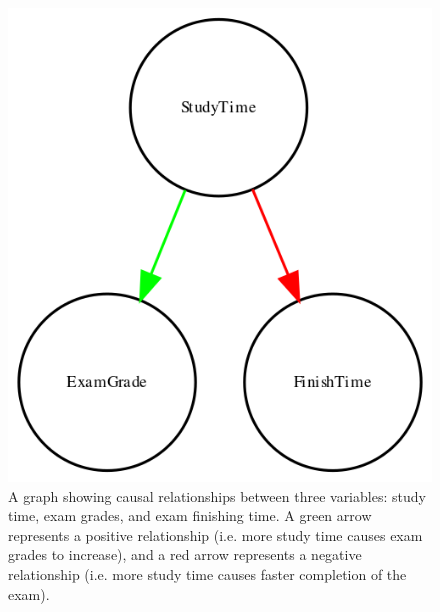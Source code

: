 \documentclass[
  12pt,
]{book}
\begin{document}
\begin{figure}
\includegraphics[width=6.94in,height=0.5\textheight]{images/dag_example} \caption{A graph showing causal relationships between three variables: study time, exam grades, and exam finishing time.  A green arrow represents a positive relationship (i.e. more study time causes exam grades to increase), and a red arrow represents a negative relationship (i.e. more study time causes faster completion of the exam).}\label{fig:simpleCausalGraph}
\end{figure}
\end{document}

